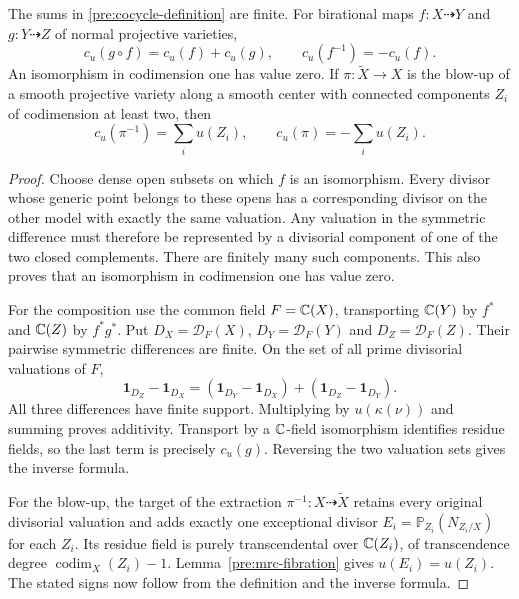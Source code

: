 \begin{lemma}\label{pre:cocycle}
The sums in \eqref{pre:cocycle-definition} are finite. For birational
maps $f:X\dashrightarrow Y$ and $g:Y\dashrightarrow Z$ of normal
projective varieties,
\begin{equation}\label{pre:cocycle-additivity}
 c_u(g\circ f)=c_u(f)+c_u(g),\qquad
 c_u(f^{-1})=-c_u(f).
\end{equation}
An isomorphism in codimension one has value zero.
If $\pi:\widetilde X\to X$ is the blow-up of a smooth projective
variety along a smooth center with connected components $Z_i$ of
codimension at least two, then
\begin{equation}\label{pre:blowup-sign}
 c_u(\pi^{-1})=\sum_i u(Z_i),\qquad
 c_u(\pi)=-\sum_i u(Z_i).
\end{equation}
\end{lemma}

\begin{proof}
Choose dense open subsets on which $f$ is an isomorphism. Every divisor
whose generic point belongs to these opens has a corresponding divisor
on the other model with exactly the same valuation. Any valuation in
the symmetric difference must therefore be represented by a divisorial
component of one of the two closed complements. There are finitely many
such components. This also proves that an isomorphism in codimension
one has value zero.

For the composition use the common field $F=\mathbb C(X)$, transporting
$\mathbb C(Y)$ by $f^*$ and $\mathbb C(Z)$ by $f^*g^*$. Put
$D_X=\mathcal D_F(X)$, $D_Y=\mathcal D_F(Y)$ and
$D_Z=\mathcal D_F(Z)$. Their pairwise symmetric differences are finite.
On the set of all prime divisorial valuations of $F$,
\[
 \mathbf 1_{D_Z}-\mathbf 1_{D_X}
 = (\mathbf 1_{D_Y}-\mathbf 1_{D_X})
   +(\mathbf 1_{D_Z}-\mathbf 1_{D_Y}).
\]
All three differences have finite support. Multiplying by
$u(\kappa(\nu))$ and summing proves additivity. Transport by a
$\mathbb C$-field isomorphism identifies residue fields, so the last term
is precisely $c_u(g)$. Reversing the two valuation sets gives the
inverse formula.

For the blow-up, the target of the extraction
$\pi^{-1}:X\dashrightarrow\widetilde X$ retains every original
divisorial valuation and adds exactly one exceptional divisor
$E_i=\mathbb P_{Z_i}(N_{Z_i/X})$ for each $Z_i$. Its residue field is
purely transcendental over $\mathbb C(Z_i)$, of transcendence degree
$\operatorname{codim}_X(Z_i)-1$. Lemma~\ref{pre:mrc-fibration} gives
$u(E_i)=u(Z_i)$. The stated signs now follow from the definition and
the inverse formula.
\end{proof}

